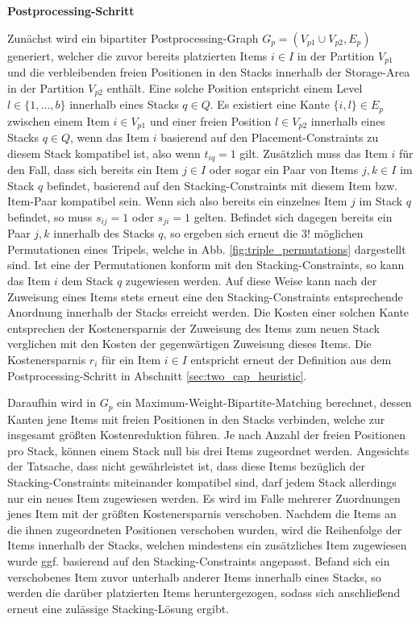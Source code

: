 \textbf{Postprocessing-Schritt}

Zunächst wird ein bipartiter Postprocessing-Graph $G_p = (V_{p1} \cup V_{p2}, E_p)$ generiert,
welcher die zuvor bereits platzierten Items $i \in I$ in der Partition $V_{p1}$ und die verbleibenden
freien Positionen in den Stacks innerhalb der Storage-Area in der Partition $V_{p2}$ enthält.
Eine solche Position entspricht einem Level $l \in \{1, \dotsc, b\}$ innerhalb eines Stacks $q \in Q$.
Es existiert eine Kante $\{i, l\} \in E_p$ zwischen einem Item $i \in V_{p1}$ und einer freien
Position $l \in V_{p2}$ innerhalb eines Stacks $q \in Q$, wenn das Item $i$ basierend auf den Placement-Constraints
zu diesem Stack kompatibel ist, also wenn $t_{iq} = 1$ gilt.
Zusätzlich muss das Item $i$ für den Fall, dass sich bereits ein Item $j \in I$ oder sogar ein Paar von Items $j, k \in I$
im Stack $q$ befindet, basierend auf den Stacking-Constraints mit diesem Item bzw. Item-Paar kompatibel sein.
Wenn sich also bereits ein einzelnes Item $j$ im Stack $q$ befindet, so muss $s_{ij} = 1$ oder $s_{ji} = 1$ gelten.
Befindet sich dagegen bereits ein Paar $j, k$ innerhalb des Stacks $q$, so ergeben sich erneut die $3!$ möglichen Permutationen
eines Tripels, welche in Abb. \ref{fig:triple_permutations} dargestellt sind. Ist eine der Permutationen konform mit den Stacking-Constraints, so kann das Item $i$ dem Stack $q$ zugewiesen werden. Auf diese Weise kann nach der Zuweisung eines Items stets erneut eine den Stacking-Constraints entsprechende Anordnung innerhalb der Stacks erreicht werden.
Die Kosten einer solchen Kante entsprechen der Kostenersparnis der Zuweisung des Items zum neuen Stack verglichen mit den Kosten der gegenwärtigen Zuweisung dieses Items. Die Kostenersparnis $r_i$ für ein Item $i \in I$ entspricht erneut der Definition aus dem Postprocessing-Schritt in Abschnitt \ref{sec:two_cap_heuristic}.

Daraufhin wird in $G_p$ ein Maximum-Weight-Bipartite-Matching berechnet, dessen Kanten jene Items
mit freien Positionen in den Stacks verbinden, welche zur insgesamt größten Kostenreduktion führen.
Je nach Anzahl der freien Positionen pro Stack, können einem Stack null bis drei Items zugeordnet werden.
Angesichts der Tatsache, dass nicht gewährleistet ist, dass diese Items bezüglich der Stacking-Constraints miteinander kompatibel sind, darf jedem Stack allerdings nur ein neues Item zugewiesen werden.
Es wird im Falle mehrerer Zuordnungen jenes Item mit der größten Kostenersparnis verschoben.
Nachdem die Items an die ihnen zugeordneten Positionen verschoben wurden, wird die Reihenfolge der Items
innerhalb der Stacks, welchen mindestens ein zusätzliches Item zugewiesen wurde ggf. basierend auf den Stacking-Constraints angepasst. Befand sich ein verschobenes Item zuvor unterhalb anderer Items innerhalb eines Stacks, so werden die darüber platzierten Items heruntergezogen, sodass sich anschließend erneut eine zulässige Stacking-Lösung ergibt.

